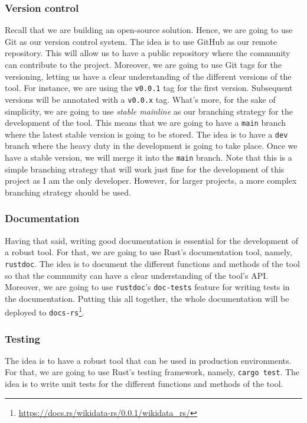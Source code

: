\subsubsection{Version control}

Recall that we are building an open-source solution. Hence, we are going to use Git as our version control system. The idea is to use GitHub as our remote repository. This will allow us to have a public repository where the community can contribute to the project. Moreover, we are going to use Git tags for the versioning, letting us have a clear understanding of the different versions of the tool. For instance, we are using the \texttt{v0.0.1} tag for the first version. Subsequent versions will be annotated with a \texttt{v0.0.x} tag. What's more, for the sake of simplicity, we are going to use \textit{stable mainline} as our branching strategy for the development of the tool. This means that we are going to have a \texttt{main} branch where the latest stable version is going to be stored. The idea is to have a \texttt{dev} branch where the heavy duty in the development is going to take place. Once we have a stable version, we will merge it into the \texttt{main} branch. Note that this is a simple branching strategy that will work just fine for the development of this project as I am the only developer. However, for larger projects, a more complex branching strategy should be used.

\subsubsection{Documentation}

Having that said, writing good documentation is essential for the development of a robust tool. For that, we are going to use Rust's documentation tool, namely, \texttt{rustdoc}. The idea is to document the different functions and methods of the tool so that the community can have a clear understanding of the tool's API. Moreover, we are going to use \texttt{rustdoc}'s \texttt{doc-tests} feature for writing tests in the documentation. Putting this all together, the whole documentation will be deployed to \texttt{docs-rs}\footnote{\url{https://docs.rs/wikidata-rs/0.0.1/wikidata_rs/}}.

\subsubsection{Testing}

The idea is to have a robust tool that can be used in production environments. For that, we are going to use Rust's testing framework, namely, \texttt{cargo test}. The idea is to write unit tests for the different functions and methods of the tool.

